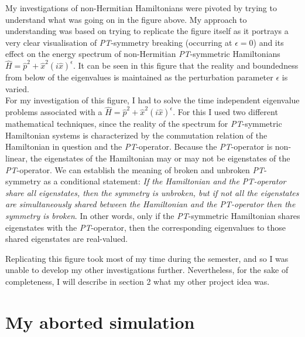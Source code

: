 \documentclass[10pt, a4paper, singlespacing, headsepline]{report}
\newcommand\PT{\emph{PT}}
\begin{document}
My investigations of non-Hermitian Hamiltonians were pivoted by trying to understand what was going on in the figure above. My approach to understanding was based on trying to replicate the figure itself as it portrays a very clear visualisation of \PT-symmetry breaking (occurring at $\epsilon = 0$) and its effect on the energy spectrum of non-Hermitian \PT-symmetric Hamiltonians $\hat{H} = \hat{p}^2 + \hat{x}^2 (i \hat{x})^{\epsilon}$. It can be seen in this figure that the reality and boundedness from below of the eigenvalues is maintained as the perturbation parameter $\epsilon$ is varied.\\

For my investigation of this figure, I had to solve the time independent eigenvalue problems associated with a $\hat{H} = \hat{p}^2 + \hat{x}^2 (i \hat{x})^{\epsilon}$. For this I used two different mathematical techniques, since the reality of the spectrum for \PT-symmetric Hamiltonian systems is characterized by the commutation relation of the Hamiltonian in question and the \PT-operator. Because the \PT-operator is non-linear, the eigenstates of the Hamiltonian may or may not be eigenstates of the \PT-operator. We can establish the meaning of broken and unbroken \PT-symmetry as a conditional statement: \emph{If the Hamiltonian and the \PT-operator share all eigenstates, then the symmetry is unbroken, but if not all the eigenstates are simultaneously shared between the Hamiltonian and the \PT-operator then the symmetry is broken}\cite{BenderPT}\cite{Bender}. In other words, only if the \PT-symmetric Hamiltonian shares eigenstates with the \PT-operator, then the corresponding eigenvalues to those shared eigenstates are real-valued.

Replicating this figure took most of my time during the semester, and so I was unable to develop my other investigations further. Nevertheless, for the sake of completeness, I will describe in section 2 what my other project idea was.

\chapter{My aborted simulation}\label{Aborted}
\end{document}
